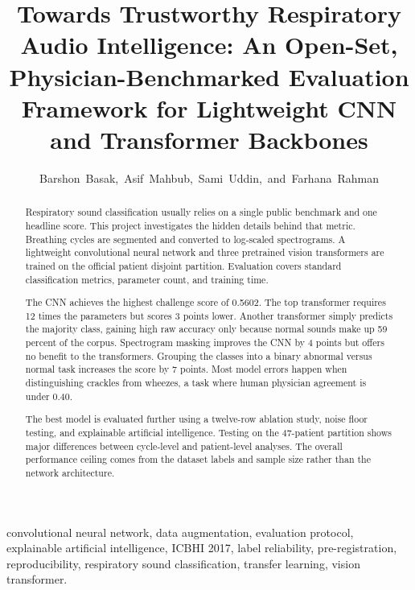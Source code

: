 \documentclass[journal,onecolumn]{IEEEtran}
\begin{document}
\title{Towards Trustworthy Respiratory Audio Intelligence: An Open-Set, Physician-Benchmarked Evaluation Framework for Lightweight CNN and Transformer Backbones}

\author{Barshon~Basak,~Asif~Mahbub,~Sami~Uddin,~and~Farhana~Rahman}

\maketitle

\begin{abstract}
Respiratory sound classification usually relies on a single public benchmark and one headline score. This project investigates the hidden details behind that metric. Breathing cycles are segmented and converted to log-scaled spectrograms. A lightweight convolutional neural network and three pretrained vision transformers are trained on the official patient disjoint partition. Evaluation covers standard classification metrics, parameter count, and training time. 

The CNN achieves the highest challenge score of 0.5602. The top transformer requires 12 times the parameters but scores 3 points lower. Another transformer simply predicts the majority class, gaining high raw accuracy only because normal sounds make up 59 percent of the corpus. Spectrogram masking improves the CNN by 4 points but offers no benefit to the transformers. Grouping the classes into a binary abnormal versus normal task increases the score by 7 points. Most model errors happen when distinguishing crackles from wheezes, a task where human physician agreement is under 0.40.

The best model is evaluated further using a twelve-row ablation study, noise floor testing, and explainable artificial intelligence. Testing on the 47-patient partition shows major differences between cycle-level and patient-level analyses. The overall performance ceiling comes from the dataset labels and sample size rather than the network architecture.
\end{abstract}

\begin{IEEEkeywords}
convolutional neural network, data augmentation, evaluation protocol,
explainable artificial intelligence, ICBHI 2017, label reliability, pre-registration,
reproducibility, respiratory sound classification, transfer learning, vision transformer.
\end{IEEEkeywords}
\end{document}

